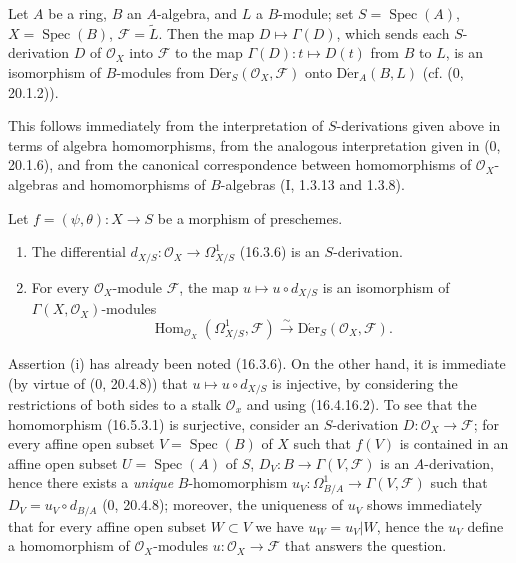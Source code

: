 \begin{proposition}[16.5.2]
\label{IV.16.5.2}
Let $A$ be a ring, $B$ an $A$-algebra, and $L$ a $B$-module; set
$S=\operatorname{Spec}(A)$, $X=\operatorname{Spec}(B)$,
$\mathscr{F}=\widetilde{L}$. Then the map $D\mapsto\Gamma(D)$, which sends
each $S$-derivation $D$ of $\mathcal{O}_X$ into $\mathscr{F}$ to the map
$\Gamma(D):t\mapsto D(t)$ from $B$ to $L$, is an
isomorphism of $B$-modules from
$\operatorname{D\acute{e}r}_S(\mathcal{O}_X,\mathscr{F})$ onto
$\operatorname{D\acute{e}r}_A(B,L)$ (cf. (0, 20.1.2)).
\end{proposition}

This follows immediately from the interpretation of $S$-derivations given above
in terms
of algebra homomorphisms, from the analogous interpretation given in
(0, 20.1.6), and from the canonical correspondence between homomorphisms of
$\mathcal{O}_X$-algebras and homomorphisms of $B$-algebras (I, 1.3.13 and
1.3.8).

\begin{proposition}[16.5.3]
\label{IV.16.5.3}
Let $f=(\psi,\theta):X\to S$ be a morphism of preschemes.
\begin{enumerate}
\item[(i)] The differential
$d_{X/S}:\mathcal{O}_X\to\Omega_{X/S}^1$ (16.3.6) is an $S$-derivation.
\item[(ii)] For every $\mathcal{O}_X$-module $\mathscr{F}$, the map
$u\mapsto u\circ d_{X/S}$ is an isomorphism of
$\Gamma(X,\mathcal{O}_X)$-modules
\[
  \operatorname{Hom}_{\mathcal{O}_X}(\Omega_{X/S}^1,\mathscr{F})
  \xrightarrow{\sim}
  \operatorname{D\acute{e}r}_S(\mathcal{O}_X,\mathscr{F}).
  \tag{16.5.3.1}
  \label{IV.16.5.3.1}
\]
\end{enumerate}
\end{proposition}

Assertion (i) has already been noted (16.3.6). On the other hand, it is immediate
(by virtue of (0, 20.4.8)) that $u\mapsto u\circ d_{X/S}$ is injective, by
considering the restrictions of both sides to a stalk $\mathcal{O}_x$ and
using (16.4.16.2). To see that the homomorphism (16.5.3.1) is surjective,
consider an $S$-derivation $D:\mathcal{O}_X\to\mathscr{F}$; for every
affine open subset $V=\operatorname{Spec}(B)$ of $X$ such that $f(V)$ is contained
in an affine open subset $U=\operatorname{Spec}(A)$ of $S$,
$D_V:B\to\Gamma(V,\mathscr{F})$ is an $A$-derivation, hence there exists a
\emph{unique} $B$-homomorphism
$u_V:\Omega_{B/A}^1\to\Gamma(V,\mathscr{F})$ such that
$D_V=u_V\circ d_{B/A}$ (0, 20.4.8); moreover, the uniqueness of $u_V$ shows
immediately that for every affine open subset $W\subset V$ we have $u_W=u_V|W$, hence
the $u_V$ define a homomorphism of $\mathcal{O}_X$-modules
$u:\mathcal{O}_X\to\mathscr{F}$ that answers the question.

